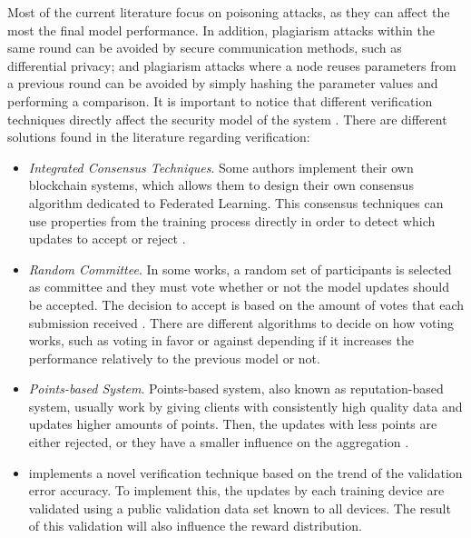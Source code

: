 Most of the current literature focus on poisoning attacks, as they can affect the most the final model performance. In addition, plagiarism attacks within the same round can be avoided by secure communication methods, such as differential privacy; and plagiarism attacks where a node reuses parameters from a previous round can be avoided by simply hashing the parameter values and performing a comparison. It is important to notice that different verification techniques directly affect the security model of the system \cite{10.48550/arxiv.2110.02182}. There are different solutions found in the literature regarding verification:

\begin{itemize}
    \item \textit{Integrated Consensus Techniques}. Some authors implement their own blockchain systems, which allows them to design their own consensus algorithm dedicated to Federated Learning. This consensus techniques can use properties from the training process directly in order to detect which updates to accept or reject \cite{9293091, 10.1007/978-981-15-9213-3_12}.
    
    \item \textit{Random Committee}. In some works, a random set of participants is selected as committee and they must vote whether or not the model updates should be accepted. The decision to accept is based on the amount of votes that each submission received \cite{9159643}. There are different algorithms to decide on how voting works, such as voting in favor or against depending if it increases the performance relatively to the previous model or not.
    
    \item \textit{Points-based System}. Points-based system, also known as reputation-based system, usually work by giving clients with consistently high quality data and updates higher amounts of points. Then, the updates with less points are either rejected, or they have a smaller influence on the aggregation  \cite{10.48550/arxiv.2011.07516, 9170559, Peyvandi2022, 9292450}.
    
    \item \cite{8945913} implements a novel verification technique based on the trend of the validation error accuracy. To implement this, the updates by each training device are validated using a public validation data set known to all devices. The result of this validation will also influence the reward distribution.

\end{itemize}

